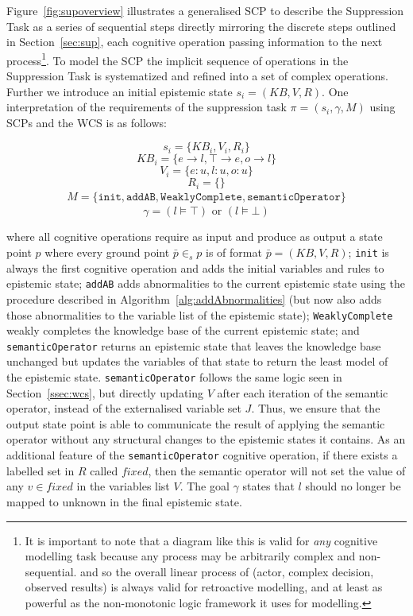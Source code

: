 \documentclass[
11pt, %
english, %
singlespacing, %
headsepline, %
]{MastersDoctoralThesis} %
\begin{document}
Figure~\ref{fig:supoverview} illustrates a generalised SCP to describe the Suppression Task as a series of sequential steps directly mirroring the discrete steps outlined in Section~\ref{sec:sup}, each cognitive operation passing information to the next process\footnote{It is important to note that a diagram like this is valid for \textit{any} cognitive modelling task because any process may be arbitrarily complex and non-sequential. and so the overall linear process of (actor, complex decision, observed results) is always valid for retroactive modelling, and at least as powerful as the non-monotonic logic framework it uses for modelling.}. To model the SCP the implicit sequence of operations in the Suppression Task is systematized and refined into a set of complex operations. Further we introduce an initial epistemic state $s_i=(KB,V,R)$. One interpretation of the requirements of the suppression task $\pi=(s_i,\gamma,M)$ using SCPs and the WCS is as follows: 
 
 
 
 


\[s_i=\{KB_i, V_i, R_i\} \]
\[KB_i=\{e \rightarrow l, \top \rightarrow e, o \rightarrow l\} \]
\[V_i=\{e:u, l:u, o:u\} \]
\[R_i=\{\} \]
\[
\begin{split}
M= \{\texttt{init}, \texttt{addAB}, \texttt{WeaklyComplete}, \texttt{semanticOperator}\}
\end{split}
\]
\[\gamma = (l\models \top) \textrm{ or } (l \models \bot)\]


where all cognitive operations require as input and produce as output a state point $p$ where every ground point $\bar{p} \in_s p$ is of format $\bar{p}=(KB,V,R)$; \texttt{init} is always the first cognitive operation and adds the initial variables and rules to epistemic state; \texttt{addAB} adds abnormalities to the current epistemic state using the procedure described in Algorithm~\ref{alg:addAbnormalities} (but now also adds those abnormalities to the variable list of the epistemic state); \texttt{WeaklyComplete} weakly completes the knowledge base of the current epistemic state; and \texttt{semanticOperator} returns an epistemic state that leaves the knowledge base unchanged but updates the variables of that state to return the least model of the epistemic state. \texttt{semanticOperator} follows the same logic seen in Section~\ref{ssec:wcs}, but directly updating $V$ after each iteration of the semantic operator, instead of the externalised variable set $J$. Thus, we ensure that the output state point is able to communicate the result of applying the semantic operator without any structural changes to the epistemic states it contains. As an additional feature of the \texttt{semanticOperator} cognitive operation, if there exists a labelled set in $R$ called $fixed$, then the semantic operator will not set the value of any $v \in fixed$ in the variables list $V$. The goal $\gamma$ states that $l$ should no longer be mapped to unknown in the final epistemic state.
\end{document}
